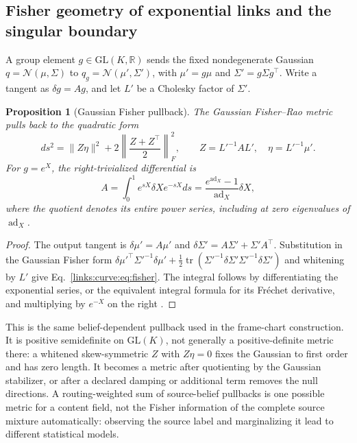 \documentclass[11pt]{article}
\newtheorem{proposition}[theorem]{Proposition}
\theoremstyle{definition}
\theoremstyle{remark}
\providecommand{\GL}{\mathrm{GL}}
\begin{document}
\subsection{Fisher geometry of exponential links and the singular boundary}
\label{links:curve:sec:natural}

A group element $g\in\GL(K,\mathbb R)$ sends the fixed nondegenerate Gaussian $q=\mathcal N(\mu,\Sigma)$ to $q_g=\mathcal N(\mu',\Sigma')$, with $\mu'=g\mu$ and $\Sigma'=g\Sigma g^\top$. Write a tangent as $\delta g=Ag$, and let $L'$ be a Cholesky factor of $\Sigma'$.
\begin{proposition}[Gaussian Fisher pullback]
\label{links:curve:prop:fisher}
The Gaussian Fisher--Rao metric pulls back to the quadratic form
\begin{equation}
ds^2=\|Z\eta\|^2+2\left\|\frac{Z+Z^\top}{2}\right\|_F^2,
\qquad Z=L'^{-1}AL',\quad \eta=L'^{-1}\mu'.
\label{links:curve:eq:fisher}
\end{equation}
For $g=e^X$, the right-trivialized differential is
\begin{equation}
A=\int_0^1 e^{sX}\delta X e^{-sX}ds
=\frac{e^{\operatorname{ad}_X}-1}{\operatorname{ad}_X}\delta X,
\label{links:curve:eq:dexp}
\end{equation}
where the quotient denotes its entire power series, including at zero eigenvalues of $\operatorname{ad}_X$.
\end{proposition}
\begin{proof}
The output tangent is $\delta\mu'=A\mu'$ and $\delta\Sigma'=A\Sigma'+\Sigma'A^\top$. Substitution in the Gaussian Fisher form
$\delta\mu'^\top\Sigma'^{-1}\delta\mu'+\tfrac12\operatorname{tr}(\Sigma'^{-1}\delta\Sigma'\Sigma'^{-1}\delta\Sigma')$
and whitening by $L'$ give Eq.~\eqref{links:curve:eq:fisher}. The integral follows by differentiating the exponential series, or the equivalent integral formula for its Fr\'echet derivative, and multiplying by $e^{-X}$ on the right \cite{frame:Hall2015}.
\end{proof}

This is the same belief-dependent pullback used in the frame-chart construction. It is positive semidefinite on $\GL(K)$, not generally a positive-definite metric there: a whitened skew-symmetric $Z$ with $Z\eta=0$ fixes the Gaussian to first order and has zero length. It becomes a metric after quotienting by the Gaussian stabilizer, or after a declared damping or additional term removes the null directions. A routing-weighted sum of source-belief pullbacks is one possible metric for a content field, not the Fisher information of the complete source mixture automatically: observing the source label and marginalizing it lead to different statistical models.
\end{document}

